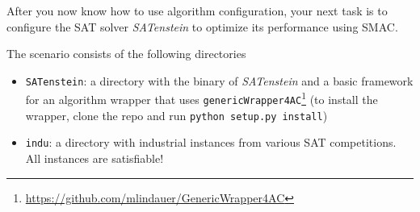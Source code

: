 \documentclass{exam}
\begin{document}
	\gccs
	After you now know how to use algorithm configuration,
	your next task is to configure the SAT solver \textit{SATenstein} to optimize its performance using SMAC.
	
	\bigskip
	
	The scenario consists of the following directories
	\begin{itemize}
		\item \texttt{SATenstein}: a directory with the binary of \textit{SATenstein} and a basic framework for an algorithm wrapper that uses \texttt{genericWrapper4AC}\footnote{\url{https://github.com/mlindauer/GenericWrapper4AC}} (to install the wrapper, clone the repo and run \texttt{python setup.py install})
		\item \texttt{indu}: a directory with industrial instances from various SAT competitions. All instances are satisfiable!
	\end{itemize}
	
\end{document}
